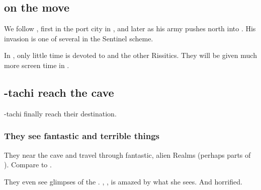 \subsection{\Narkiza{} on the move}

We follow \Narkiza{}, first in the port city in \Scyrum, and later as his army pushes north into \Velcad{}. His invasion is one of several  in the Sentinel scheme.

In \TwilightAngelRememberEmph, only little time is devoted to \Narkiza{} and the other Rissitics. They will be given much more screen time in \emph{\CarzainWithRedcorBook}. 













\subsection{\Shilred-tachi reach the cave}
\Shilred-tachi finally reach their destination. 





\subsubsection{They see fantastic and terrible things}
They near the cave and travel through fantastic, alien Realms (perhaps parts of ). Compare to . 

They even see glimpses of the \xss. 
\Shilred{}, , is amazed by what she sees. And horrified.


